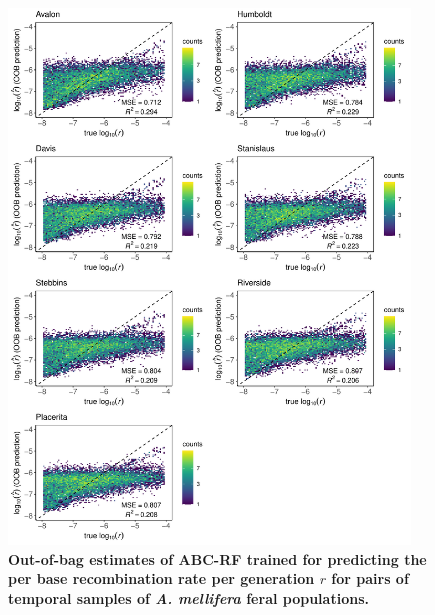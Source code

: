 \documentclass[a4paper, 12pt]{article}
\begin{document}
\begin{figure}[ht]
  \centering
  \includegraphics[width=0.95\textwidth]{Figures/FigureS24_combined_plot_rr.pdf}
  \small\caption{\textbf{Out-of-bag estimates of ABC-RF trained for predicting the per base recombination rate per generation $r$ for pairs of temporal samples of \textit{A. mellifera} feral populations.}}
  \label{fig:supple_feralbee_r}
\end{figure}
\end{document}
